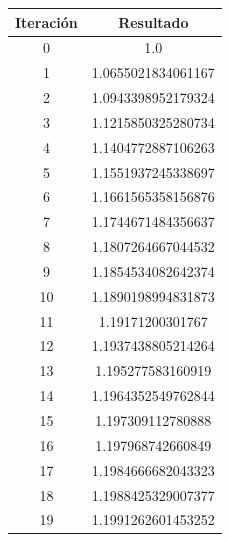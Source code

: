 \documentclass[titlepage,a4paper]{article}
\begin{document}
\begin{multicols}{2}
    \begin{center}
        \begin{tabular}{| c | c |}
        \hline
         Iteración & Resultado \\ \hline
  0     &  1.0 \\
1     &  1.0655021834061167 \\
2     &  1.0943398952179324 \\
3     &  1.1215850325280734 \\
4     &  1.1404772887106263 \\
5     &  1.1551937245338697 \\
6     &  1.1661565358156876 \\
7     &  1.1744671484356637 \\
8     &  1.1807264667044532 \\
9     &  1.1854534082642374 \\
10     &  1.1890198994831873 \\
11     &  1.19171200301767 \\
12     &  1.1937438805214264 \\
13     &  1.195277583160919 \\
14     &  1.1964352549762844 \\
15     &  1.197309112780888 \\
16     &  1.197968742660849 \\
17     &  1.1984666682043323 \\
18     &  1.1988425329007377 \\
19     &  1.1991262601453252 \\


\end{tabular}
\end{center}
\end{multicols}
\end{document}
